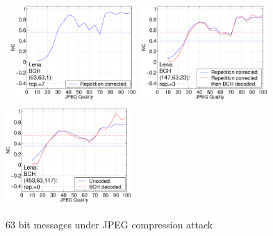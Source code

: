 \documentclass[12pt]{report}
\begin{document}
\begin{figure}[p]
\centerline{ \hbox{
\includegraphics[height=3.81cm,width=4.8cm]{EPS_BK_formattedBetter/ml63len63.eps}
\includegraphics[height=3.81cm,width=4.8cm]{EPS_BK_formattedBetter/ml63len147.eps}
\includegraphics[height=3.81cm,width=4.8cm]{EPS_BK_formattedBetter/ml63len453.eps}
}}
 
        \caption{63 bit messages under JPEG compression attack}
        \label{fig:63BK32_63_148}
 
\setlength{\abovecaptionskip}{0cm}
\end{figure}
\end{document}
